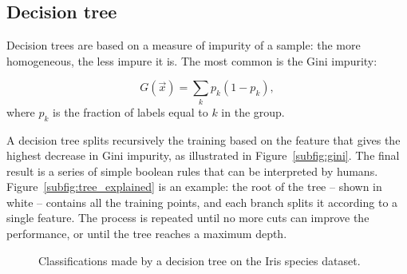 \subsection{Decision tree}\label{sec:decision_tree}
Decision trees are based on a measure of impurity of a sample: the more homogeneous, the less impure it is.
The most common is the Gini impurity:

\[ G(\vec x) = \sum_k p_{k} (1-p_k),\]
where $p_k$ is the fraction of labels equal to $k$ in the group.

A decision tree splits recursively the training based on the feature that gives the highest decrease in Gini impurity, as illustrated in Figure~\ref{subfig:gini}.
The final result is a series of simple boolean rules that can be interpreted by humans.
Figure~\ref{subfig:tree_explained} is an example: the root of the tree -- shown in white -- contains all the training points, and each branch splits it according to a single feature.
The process is repeated until no more cuts can improve the performance, or until the tree reaches a maximum depth.

\begin{figure}[tb]
	\hfil
	\caption{Classifications made by a decision tree on the Iris species dataset.}\label{fig:tree}
\end{figure}


